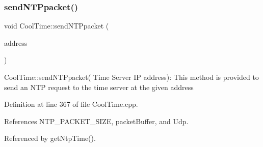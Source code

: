 \subsubsection{\texorpdfstring{send\+N\+T\+Ppacket()}{sendNTPpacket()}}
{\footnotesize\ttfamily void Cool\+Time\+::send\+N\+T\+Ppacket (\begin{DoxyParamCaption}\item[{I\+P\+Address \&}]{address }\end{DoxyParamCaption})}

Cool\+Time\+::send\+N\+T\+Ppacket( Time Server I\+P address)\+: This method is provided to send an N\+TP request to the time server at the given address 

Definition at line 367 of file Cool\+Time.\+cpp.



References N\+T\+P\+\_\+\+P\+A\+C\+K\+E\+T\+\_\+\+S\+I\+ZE, packet\+Buffer, and Udp.



Referenced by get\+Ntp\+Time().


